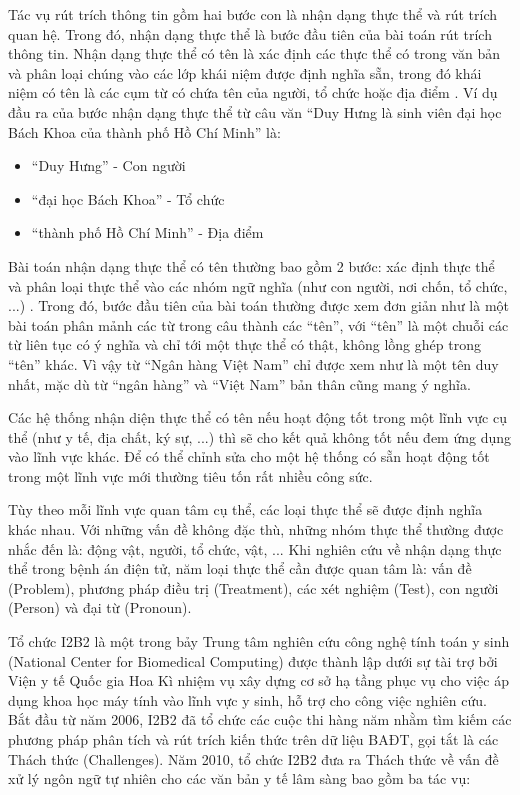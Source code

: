 Tác vụ rút trích thông tin gồm hai bước con là nhận dạng thực thể và rút trích quan hệ. Trong đó, nhận dạng thực thể là bước đầu tiên của bài toán rút trích thông tin. Nhận dạng thực thể có tên là xác định các thực thể có trong văn bản và phân loại chúng vào các lớp khái niệm được định nghĩa sẵn, trong đó khái niệm có tên là các cụm từ có chứa tên của người, tổ chức hoặc địa điểm \cite{KimSang2003}. Ví dụ đầu ra của bước nhận dạng thực thể từ câu văn ``Duy Hưng là sinh viên đại học Bách Khoa của thành phố Hồ Chí Minh'' là:

\begin{itemize}[noitemsep]
\item ``Duy Hưng'' - Con người
\item ``đại học Bách Khoa'' - Tổ chức
\item ``thành phố Hồ Chí Minh'' - Địa điểm
\end{itemize}

Bài toán nhận dạng thực thể có tên thường bao gồm 2 bước: xác định thực thể và phân loại thực thể vào các nhóm ngữ nghĩa (như con người, nơi chốn, tổ chức, ...) \cite{KimSang2003}. Trong đó, bước đầu tiên của bài toán thường được xem đơn giản như là một bài toán phân mảnh các từ trong câu thành các ``tên'', với ``tên'' là một chuỗi các từ liên tục có ý nghĩa và chỉ tới một thực thể có thật, không lồng ghép trong ``tên'' khác. Vì vậy từ ``Ngân hàng Việt Nam'' chỉ được xem như là một tên duy nhất, mặc dù từ ``ngân hàng'' và ``Việt Nam'' bản thân cũng mang ý nghĩa.

Các hệ thống nhận diện thực thể có tên nếu hoạt động tốt trong một lĩnh vực cụ thể (như y tế, địa chất, ký sự, ...) thì sẽ cho kết quả không tốt nếu đem ứng dụng vào lĩnh vực khác. Để có thể chỉnh sửa cho một hệ thống có sẵn hoạt động tốt trong một lĩnh vực mới thường tiêu tốn rất nhiều công sức.

Tùy theo mỗi lĩnh vực quan tâm cụ thể, các loại thực thể sẽ được định nghĩa khác nhau. Với những vấn đề không đặc thù, những nhóm thực thể thường được nhắc đến là: động vật, người, tổ chức, vật, ... Khi nghiên cứu về nhận dạng thực thể trong bệnh án điện tử, năm loại thực thể cần được quan tâm là: vấn đề (Problem), phương pháp điều trị (Treatment), các xét nghiệm (Test), con người (Person) và đại từ (Pronoun).

Tổ chức I2B2 là một trong bảy Trung tâm nghiên cứu công nghệ tính toán y sinh (National Center for Biomedical Computing) được thành lập dưới sự tài trợ bởi Viện y tế Quốc gia Hoa Kì nhiệm vụ xây dựng cơ sở hạ tầng phục vụ cho việc áp dụng khoa học máy tính vào lĩnh vực y sinh, hỗ trợ cho công việc nghiên cứu. Bắt đầu từ năm 2006, I2B2 đã tổ chức các cuộc thi hàng năm nhằm tìm kiếm các phương pháp phân tích và rút trích kiến thức trên dữ liệu BAĐT, gọi tắt là các Thách thức (Challenges). Năm 2010, tổ chức I2B2 đưa ra Thách thức về vấn đề xử lý ngôn ngữ tự nhiên cho các văn bản y tế lâm sàng bao gồm ba tác vụ:

